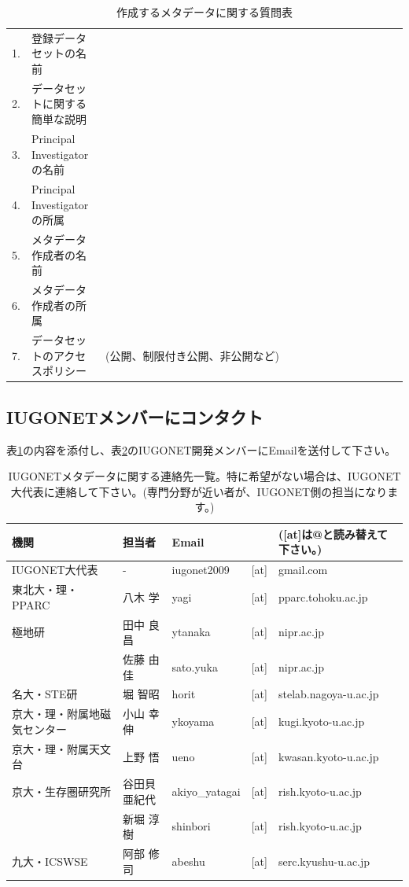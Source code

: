 \begin{table}[H]
\begin{center}
\caption{作成するメタデータに関する質問表}
\label{initial}
\begin{tabular}{ll|l}\hline
1. & 登録データセットの名前 & \ \ \ \ \ \ \ \ \ \ \ \ \ \ \ \ \ \ \ \ \ \ \ \ \ \ \ \ \ \ \ \ \ \ \ \ \ \ \ \ \ \ \ \ \ \ \ \ \ \ \ \ \ \\
2. & データセットに関する簡単な説明 & \\
3. & Principal Investigatorの名前 & \\
4. & Principal Investigatorの所属 & \\
5. & メタデータ作成者の名前 & \\
6. & メタデータ作成者の所属 & \\
7. & データセットのアクセスポリシー & (公開、制限付き公開、非公開など) \\ \hline
\end{tabular}
\end{center}
\end{table}

\subsection{IUGONETメンバーにコンタクト}\label{contact}
表\ref{initial}の内容を添付し、表\ref{contact}のIUGONET開発メンバーにEmailを送付して下さい。

\begin{table}[H]
\begin{center}
\caption{IUGONETメタデータに関する連絡先一覧。特に希望がない場合は、IUGONET大代表に連絡して下さい。(専門分野が近い者が、IUGONET側の担当になります。)}
\label{contact}
\begin{tabular}{lllll}\hline
機関 & 担当者 & Email& & ([at]は@と読み替えて下さい。)\\ \hline
\cellcolor[gray]{0.9}IUGONET大代表 & \cellcolor[gray]{0.9}- & \cellcolor[gray]{0.9}iugonet2009 & \cellcolor[gray]{0.9}[at] & \cellcolor[gray]{0.9}gmail.com\\ 
東北大・理・PPARC & 八木 学 & yagi & [at] & pparc.tohoku.ac.jp\\
極地研 & 田中 良昌 & ytanaka & [at] & nipr.ac.jp\\
  & 佐藤 由佳 & sato.yuka & [at] & nipr.ac.jp\\
名大・STE研 & 堀 智昭 & horit & [at] & stelab.nagoya-u.ac.jp\\
京大・理・附属地磁気センター & 小山 幸伸 & ykoyama & [at] & kugi.kyoto-u.ac.jp\\
京大・理・附属天文台 & 上野 悟 & ueno & [at] & kwasan.kyoto-u.ac.jp\\
京大・生存圏研究所 & 谷田貝 亜紀代 & akiyo\_yatagai & [at] & rish.kyoto-u.ac.jp\\
 & 新堀 淳樹 & shinbori & [at] & rish.kyoto-u.ac.jp\\
九大・ICSWSE & 阿部 修司 & abeshu & [at] & serc.kyushu-u.ac.jp\\ \hline
\end{tabular}
\end{center}
\end{table}

